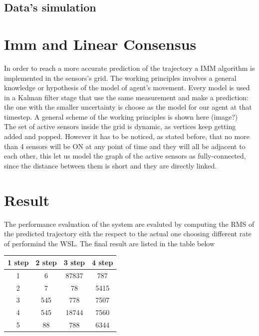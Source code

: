 \documentclass[twocolumn]{article}
\begin{document}
    \subsection*{Data's simulation}

    \section*{Imm and Linear Consensus}
    In order to reach a more accurate prediction of the trajectory a IMM algorithm is implemented in the sensors's grid. The working principles 
    involves a general knowledge or hypothesis of the model of agent's movement. Every model is used in a Kalman filter stage that use the same measurement and make
    a prediction: the one with the smaller uncertainty is choose as the model for our agent at that timestep. A general scheme of the working principles is shown here (image?)
    \\
    The set of active sensors inside the grid is dynamic, as vertices keep getting added and popped. However it has to be noticed, as stated before, that no 
     more than 4 sensors will be ON at any point of time and they will all be adjacent to each other, this let us model the graph of the active 
     sensors as fully-connected, since the distance between them is short and they are directly linked.
    \\
    \section*{Result}
    The performance evaluation of the system are evaluted by computing the RMS of the predicted trajectory eith the respect to the actual one
    choosing different rate of performind the WSL. The final result are listed in the table below


    \begin{center}
        \begin{tabular}{||c c c c||}
            \hline
            1 step & 2 step & 3 step & 4 step \\ [0.5ex]
            \hline\hline
            1      & 6      & 87837  & 787    \\
            \hline
            2      & 7      & 78     & 5415   \\
            \hline
            3      & 545    & 778    & 7507   \\
            \hline
            4      & 545    & 18744  & 7560   \\
            \hline
            5      & 88     & 788    & 6344   \\ [1ex]
            \hline
        \end{tabular}
    \end{center}
\end{document}
